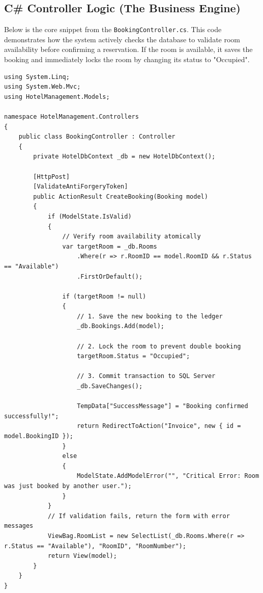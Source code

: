 \documentclass[12pt,a4paper]{article}
\begin{document}
\newpage
\subsection{C\# Controller Logic (The Business Engine)}
Below is the core snippet from the \texttt{BookingController.cs}. This code demonstrates how the system actively checks the database to validate room availability before confirming a reservation. If the room is available, it saves the booking and immediately locks the room by changing its status to "Occupied".

\begin{lstlisting}[language={[Sharp]C}, caption=C\# Controller Logic for Processing a Booking]
using System.Linq;
using System.Web.Mvc;
using HotelManagement.Models;

namespace HotelManagement.Controllers
{
    public class BookingController : Controller
    {
        private HotelDbContext _db = new HotelDbContext();

        [HttpPost]
        [ValidateAntiForgeryToken]
        public ActionResult CreateBooking(Booking model)
        {
            if (ModelState.IsValid)
            {
                // Verify room availability atomically
                var targetRoom = _db.Rooms
                    .Where(r => r.RoomID == model.RoomID && r.Status == "Available")
                    .FirstOrDefault();

                if (targetRoom != null)
                {
                    // 1. Save the new booking to the ledger
                    _db.Bookings.Add(model);
                    
                    // 2. Lock the room to prevent double booking
                    targetRoom.Status = "Occupied";
                    
                    // 3. Commit transaction to SQL Server
                    _db.SaveChanges();

                    TempData["SuccessMessage"] = "Booking confirmed successfully!";
                    return RedirectToAction("Invoice", new { id = model.BookingID });
                }
                else
                {
                    ModelState.AddModelError("", "Critical Error: Room was just booked by another user.");
                }
            }
            // If validation fails, return the form with error messages
            ViewBag.RoomList = new SelectList(_db.Rooms.Where(r => r.Status == "Available"), "RoomID", "RoomNumber");
            return View(model);
        }
    }
}
\end{lstlisting}
\end{document}
